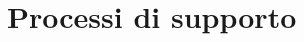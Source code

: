 \documentclass[../NormeProgetto.tex]{subfiles}
\begin{document}
\section{Processi di supporto}
	
	
	
\end{document}
